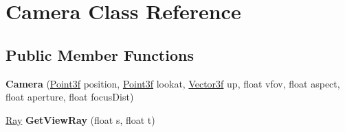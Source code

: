 \hypertarget{class_camera}{}\section{Camera Class Reference}
\label{class_camera}
\subsection*{Public Member Functions}
\begin{DoxyCompactItemize}
\item 
\mbox{\label{class_camera_accc0f67b4fb9147f24076abdbdc6aed8}} 
{\bfseries Camera} (\mbox{\hyperlink{class_point}{Point3f}} position, \mbox{\hyperlink{class_point}{Point3f}} lookat, \mbox{\hyperlink{class_vector3}{Vector3f}} up, float vfov, float aspect, float aperture, float focus\+Dist)
\item 
\mbox{\label{class_camera_a34f92de5de9f765d1ecb10e665eca807}} 
\mbox{\hyperlink{class_ray}{Ray}} {\bfseries Get\+View\+Ray} (float s, float t)
\end{DoxyCompactItemize}
